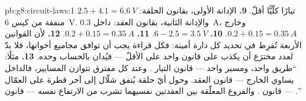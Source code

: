 \begin{solution}{pb:g8:circuit-laws:1}
تيارًا كلّيًّا أقلّ.
\textbf{9.} الإدانة الأولى، بقانون الحلقة: $2.5 + 4.1 =
\qty{6.6}{V}$ منفقة من كيس \qty{6}{V}. والإدانة الثانية،
بقانون العقد: داخل \qty{0.3}{A}، وخارج $0.2 + 0.15 =
\qty{0.35}{A}$.
\textbf{10.} $6 - 2.5 = \qty{3.5}{V}$.
\textbf{11.} $0.2 + 0.15 = \qty{0.35}{A}$.
\textbf{12.} لأن القوانين الأربعة تُفرِط في تحديد كل دارة
أمينة: فكل قراءة يجب أن توافق مجاميع أخواتها، فلا بدّ لعدد
مخترَع أن يكذب على قانون واحد على الأقلّ --- فيُدان بالحساب
وحده.
\textbf{13.} مثلًا: ``طريق واحد، ومسير واحد --- قانون التيار
. وعند كل مفترق تتوازن المسايير، فالداخل يساوي
الخارج --- قانون العقد. وحول أيّ حلقة يُنفق شلّال  إلى
آخر قطرة على العمّال --- قانون  . والفروع
المعلّقة بين العقدتين نفسيهما تشرب من الارتفاع نفسه --- قانون
 .''
\end{solution}

